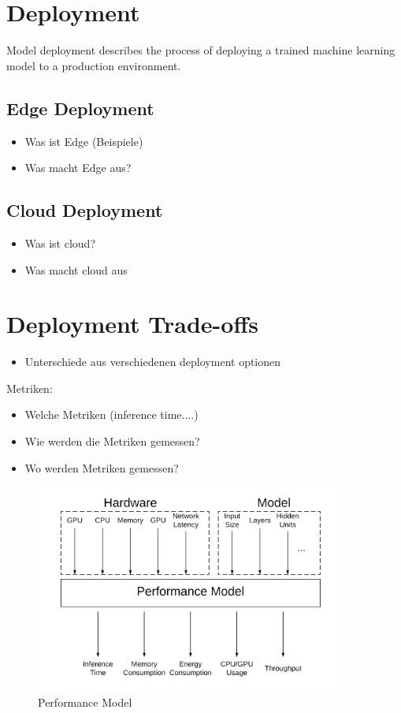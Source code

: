 \section{Deployment}
Model deployment describes the process of deploying a trained machine learning model to a production environment.
\subsection{Edge Deployment}
\begin{itemize}
    \item Was ist Edge (Beispiele)
    \item Was macht Edge aus?
\end{itemize}
\subsection{Cloud Deployment}
\begin{itemize}
    \item Was ist cloud?
    \item Was macht cloud aus
\end{itemize}
\section{Deployment Trade-offs}
\begin{itemize}
    \item Unterschiede aus verschiedenen deployment optionen
\end{itemize}
Metriken:
\begin{itemize}
    \item Welche Metriken (inference time....)
    \item Wie werden die Metriken gemessen?
    \item Wo werden Metriken gemessen?
\end{itemize}
\begin{figure}[H]
\centering
\includegraphics[width=0.9\textwidth]{./Bilder/trade_offs.png}
\caption{Performance Model}
\label{fig:perf_model}
\end{figure}
\endinput 